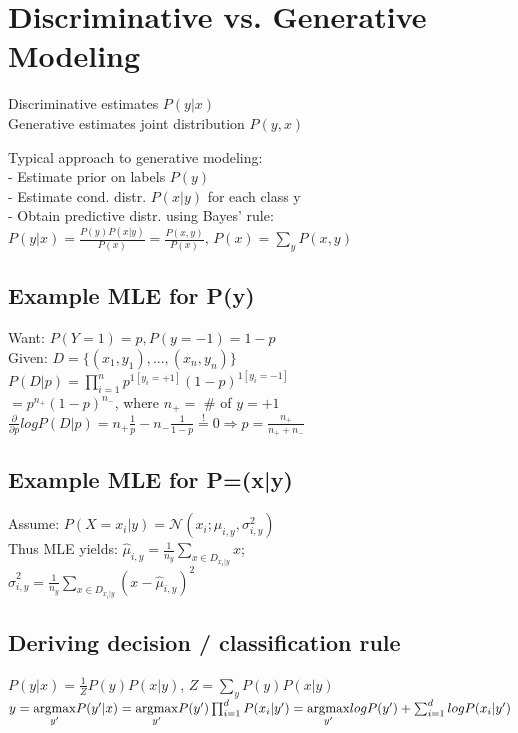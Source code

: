 \section*{Discriminative vs. Generative Modeling}
Discriminative estimates $P(y|x)$\\
Generative estimates joint distribution $P(y,x)$

Typical approach to generative modeling:\\
- Estimate prior on labels $P(y)$\\
- Estimate cond. distr. $P(x|y)$ for each class y\\
- Obtain predictive distr. using Bayes' rule:\\
$P(y|x) = \frac{P(y) P(x|y)}{P(x)} = \frac{P(x,y)}{P(x)}$, $P(x) = \sum_y P(x,y)$


\subsection*{Example MLE for P(y)}
Want: $P(Y=1) = p, P(y=-1) = 1-p$\\
Given: $D=\{(x_1,y_1),...,(x_n,y_n)\}$\\
$P(D|p) = \prod_{i=1}^n p^{1[y_i=+1]} (1-p)^{1[y_i=-1]}$\\
$=p^{n_+} (1-p)^{n_-}$, where $n_+ = $ \# of $y=+1$\\
$\frac{\partial}{\partial p} log P(D|p) = n_+ \frac{1}{p} - n_- \frac{1}{1-p} \overset{!}{=} 0 \Rightarrow p=\frac{n_+}{n_+ + n_-}$

\subsection*{Example MLE for P=(x|y)}
Assume: $P(X=x_i|y) = \mathcal{N}(x_i;\mu_{i,y}, \sigma_{i,y}^2)$\\
Thus MLE yields:
$\hat{\mu}_{i,y} = \frac{1}{n_y} \sum_{x\in D_{x_i|y}} x$;\\ %
$\hat{\sigma}_{i,y}^2 = \frac{1}{n_y} \sum_{x\in D_{x_i|y}} (x-\hat{\mu}_{i,y})^2$

\subsection*{Deriving decision / classification rule}
$P(y|x) = \frac{1}{Z} P(y)P(x|y)$, $Z = \sum_y P(y) P(x|y)$\\
$y = \underset{y'}{\operatorname{argmax}} P(y'|x) = \underset{y'}{\operatorname{argmax}} P(y') \prod_{i=1}^d P(x_i|y')\\
= \underset{y'}{\operatorname{argmax}} log P(y') + \sum_{i=1}^d log P(x_i|y')$

